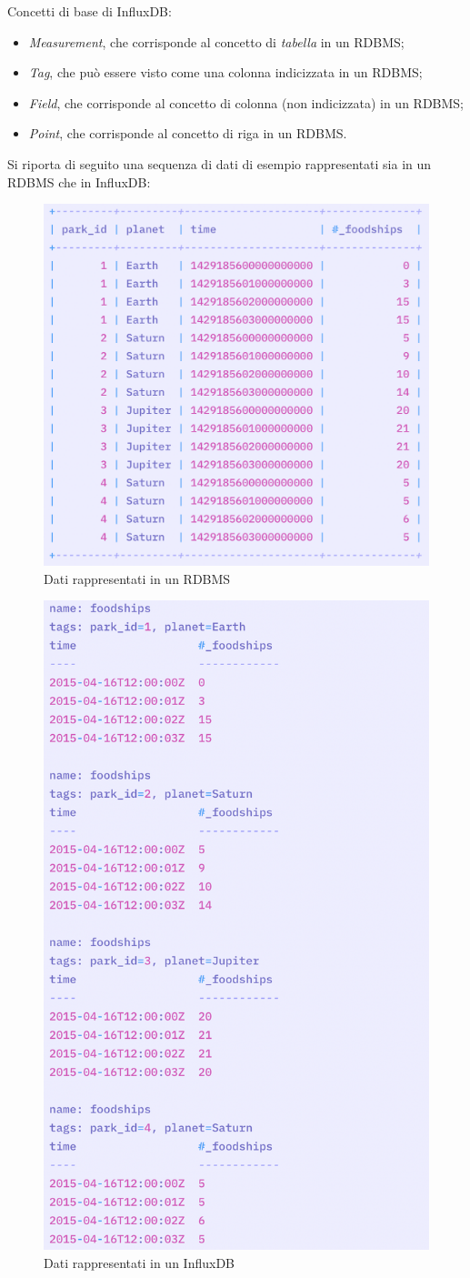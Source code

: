 \documentclass{article}
\begin{document}
\bigskip
\noindent
Concetti di base di InfluxDB:
\begin{itemize}[noitemsep]
    \item \textit{Measurement}, che corrisponde al concetto di \textit{tabella} in un RDBMS;
    \item \textit{Tag}, che può essere visto come una colonna indicizzata in un RDBMS;
    \item \textit{Field}, che corrisponde al concetto di colonna (non indicizzata) in un RDBMS;
    \item \textit{Point}, che corrisponde al concetto di riga in un RDBMS.
\end{itemize}

\smallskip
\noindent
Si riporta di seguito una sequenza di dati di esempio rappresentati sia in un RDBMS che in InfluxDB:
\begin{figure}[H]
\includegraphics[width=0.5\linewidth]{Data-RDBMS}
\centering
\caption*{Dati rappresentati in un RDBMS}
\label{fig:bytepost}
\end{figure}

\begin{figure}[H]
\includegraphics[width=0.5\linewidth]{Data-InfluxDB}
\centering
\caption*{Dati rappresentati in un InfluxDB}
\label{fig:bytepost}
\end{figure}
\end{document}
